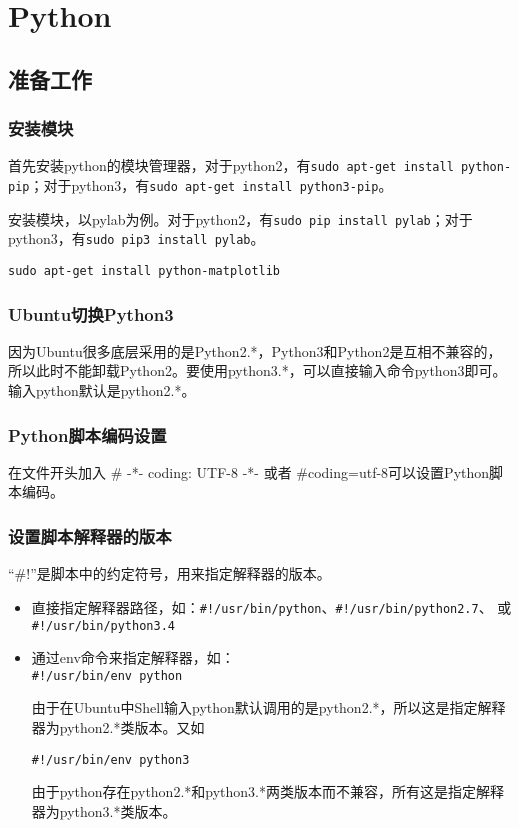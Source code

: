 \chapter{Python}
\section{准备工作}
\subsection{安装模块}
首先安装python的模块管理器，对于python2，有\verb|sudo apt-get install python-pip|；对于python3，有\verb|sudo apt-get install python3-pip|。

安装模块，以pylab为例。对于python2，有\verb|sudo pip install pylab|；对于python3，有\verb|sudo pip3 install pylab|。

\verb|sudo apt-get install python-matplotlib|



\subsection{Ubuntu切换Python3}
因为Ubuntu很多底层采用的是Python2.*，Python3和Python2是互相不兼容的，所以此时不能卸载Python2。要使用python3.*，可以直接输入命令python3即可。输入python默认是python2.*。



\subsection{Python脚本编码设置}
在文件开头加入 \# -*- coding: UTF-8 -*- 或者 \#coding=utf-8可以设置Python脚本编码。


\subsection{设置脚本解释器的版本}
``\#!''是脚本中的约定符号，用来指定解释器的版本。
\begin{itemize}
\item 直接指定解释器路径，如：\verb|#!/usr/bin/python|、\verb|#!/usr/bin/python2.7|、
或\verb|#!/usr/bin/python3.4|

\item 通过env命令来指定解释器，如：\\

\verb|#!/usr/bin/env python|

由于在Ubuntu中Shell输入python默认调用的是python2.*，所以这是指定解释器为python2.*类版本。又如

\verb|#!/usr/bin/env python3|

由于python存在python2.*和python3.*两类版本而不兼容，所有这是指定解释器为python3.*类版本。
\end{itemize}



